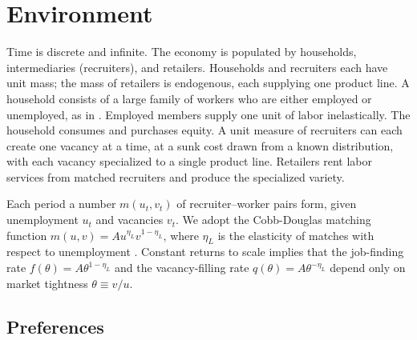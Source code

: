 \documentclass[authoryear, review, 12pt]{elsarticle}
\begin{document}
	
	\section{Environment}\label{sec:environment}
	
	Time is discrete and infinite. The economy is populated by 
	households, intermediaries (recruiters), and retailers. Households 
	and recruiters each have unit mass; the mass of retailers is 
	endogenous, each supplying one product line. A household consists 
	of a large family of workers who are either employed or unemployed, 
	as in \citet{merz_1995}. Employed members supply one unit of labor 
	inelastically. The household consumes and purchases equity. A unit 
	measure of recruiters can each create one vacancy at a time, at a 
	sunk cost drawn from a known distribution, with each vacancy 
	specialized to a single product line. Retailers rent labor services 
	from matched recruiters and produce the specialized variety.
	
	Each period a number $m(u_t,v_t)$ of recruiter--worker pairs form, 
	given unemployment $u_t$ and vacancies $v_t$. We adopt the 
	Cobb-Douglas matching function $m(u,v)=Au^{\eta_L}v^{1-\eta_L}$, 
	where $\eta_L$ is the elasticity of matches with respect to 
	unemployment \citep{petrongolo_2001}. Constant returns to scale 
	implies that the job-finding rate $f(\theta)=A\theta^{1-\eta_L}$ 
	and the vacancy-filling rate $q(\theta)=A\theta^{-\eta_L}$ depend 
	only on market tightness $\theta\equiv v/u$.
	\subsection{Preferences}
	
\end{document}
